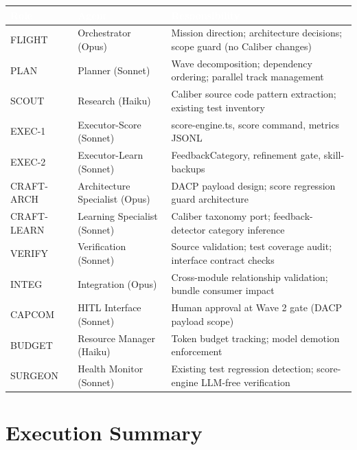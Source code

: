 \documentclass[11pt,letterpaper]{article}
\newcommand{\tableheader}[1]{\textbf{\sffamily\textcolor{white}{#1}}}
\begin{document}
\begin{center}
\begin{tabularx}{\textwidth}{L{2cm}L{3.5cm}X}
\toprule
{}
\tableheader{Role} & \tableheader{Agent} & \tableheader{Responsibility} \\
\midrule
FLIGHT & Orchestrator (Opus) & Mission direction; architecture decisions; scope guard (no Caliber changes) \\
PLAN & Planner (Sonnet) & Wave decomposition; dependency ordering; parallel track management \\
SCOUT & Research (Haiku) & Caliber source code pattern extraction; existing test inventory \\
EXEC-1 & Executor-Score (Sonnet) & score-engine.ts, score command, metrics JSONL \\
EXEC-2 & Executor-Learn (Sonnet) & FeedbackCategory, refinement gate, skill-backups \\
CRAFT-ARCH & Architecture Specialist (Opus) & DACP payload design; score regression guard architecture \\
CRAFT-LEARN & Learning Specialist (Sonnet) & Caliber taxonomy port; feedback-detector category inference \\
VERIFY & Verification (Sonnet) & Source validation; test coverage audit; interface contract checks \\
INTEG & Integration (Opus) & Cross-module relationship validation; bundle consumer impact \\
CAPCOM & HITL Interface (Sonnet) & Human approval at Wave 2 gate (DACP payload scope) \\
BUDGET & Resource Manager (Haiku) & Token budget tracking; model demotion enforcement \\
SURGEON & Health Monitor (Sonnet) & Existing test regression detection; score-engine LLM-free verification \\
\bottomrule
\end{tabularx}
\end{center}

\section{Execution Summary}
\end{document}
